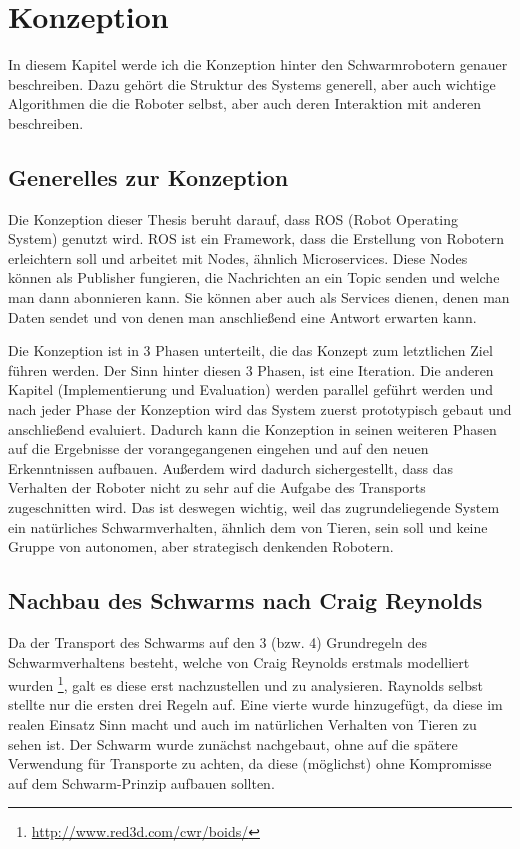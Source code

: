 \chapter{Konzeption}\label{ch:Konzeption}

In diesem Kapitel werde ich die Konzeption hinter den Schwarmrobotern genauer beschreiben. Dazu gehört die Struktur des Systems generell, aber auch wichtige Algorithmen die die Roboter selbst, aber auch deren Interaktion mit anderen beschreiben.

\section{Generelles zur Konzeption}

Die Konzeption dieser Thesis beruht darauf, dass ROS (Robot Operating System) genutzt wird. ROS ist ein Framework, dass die Erstellung von Robotern erleichtern soll und arbeitet mit Nodes, ähnlich Microservices. Diese Nodes können als Publisher fungieren, die Nachrichten an ein Topic senden und welche man dann abonnieren kann. Sie können aber auch als Services dienen, denen man Daten sendet und von denen man anschließend eine Antwort erwarten kann.

Die Konzeption ist in 3 Phasen unterteilt, die das Konzept zum letztlichen Ziel führen werden. Der Sinn hinter diesen 3 Phasen, ist eine Iteration. Die anderen Kapitel (Implementierung und Evaluation) werden parallel geführt werden und nach jeder Phase der Konzeption wird das System zuerst prototypisch gebaut und anschließend evaluiert. Dadurch kann die Konzeption in seinen weiteren Phasen auf die Ergebnisse der vorangegangenen eingehen und auf den neuen Erkenntnissen aufbauen. Außerdem wird dadurch sichergestellt, dass das Verhalten der Roboter nicht zu sehr auf die Aufgabe des Transports zugeschnitten wird. Das ist deswegen wichtig, weil das zugrundeliegende System ein natürliches Schwarmverhalten, ähnlich dem von Tieren, sein soll und keine Gruppe von autonomen, aber strategisch denkenden Robotern.

\section{Nachbau des Schwarms nach Craig Reynolds}
Da der Transport des Schwarms auf den 3 (bzw. 4) Grundregeln des Schwarmverhaltens besteht, welche von Craig Reynolds erstmals modelliert wurden \footnote{\url{http://www.red3d.com/cwr/boids/}}, galt es diese erst nachzustellen und zu analysieren. Raynolds selbst stellte nur die ersten drei Regeln auf. Eine vierte wurde hinzugefügt, da diese im realen Einsatz Sinn macht und auch im natürlichen Verhalten von Tieren zu sehen ist. Der Schwarm wurde zunächst nachgebaut, ohne auf die spätere Verwendung für Transporte zu achten, da diese (möglichst) ohne Kompromisse auf dem Schwarm-Prinzip aufbauen sollten. 

